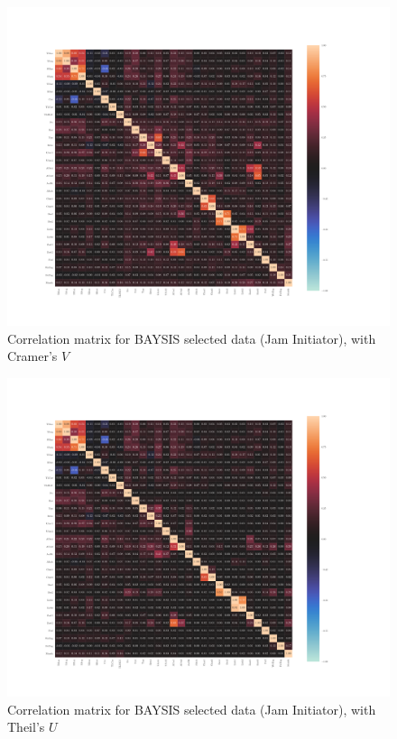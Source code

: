\documentclass[a4paper,headsepline,footsepline,fontsize=11pt,BCOR=12mm,DIV=12]{report}
\begin{document}
\begin{appendices}
\begin{figure}[h]
	\centering
	\includegraphics[scale=0.52, trim=2cm 2cm 0cm 0cm]{../CorrAnalysis/data/BAYSIS/03_selected_01_startJam/plots/baysis_selected_corr_cramers}
	\caption{Correlation matrix for BAYSIS selected data (Jam Initiator), with Cramer's $V$}
	\label{img:appendix_correlation_matrix_selected_startJam_cramers}
\end{figure}
\restoregeometry

\label{appendix_baysis_dataset_corr_theils}
\begin{figure}[h]
	\centering
	\includegraphics[scale=0.52, trim=2cm 2cm 0cm 0cm]{../CorrAnalysis/data/BAYSIS/03_selected_01_startJam/plots/baysis_selected_corr_theils}
	\caption{Correlation matrix for BAYSIS selected data (Jam Initiator), with Theil's $U$}
	\label{img:appendix_correlation_matrix_selected_startJam_theils}
\end{figure}
\restoregeometry


\end{appendices}
\end{document}
